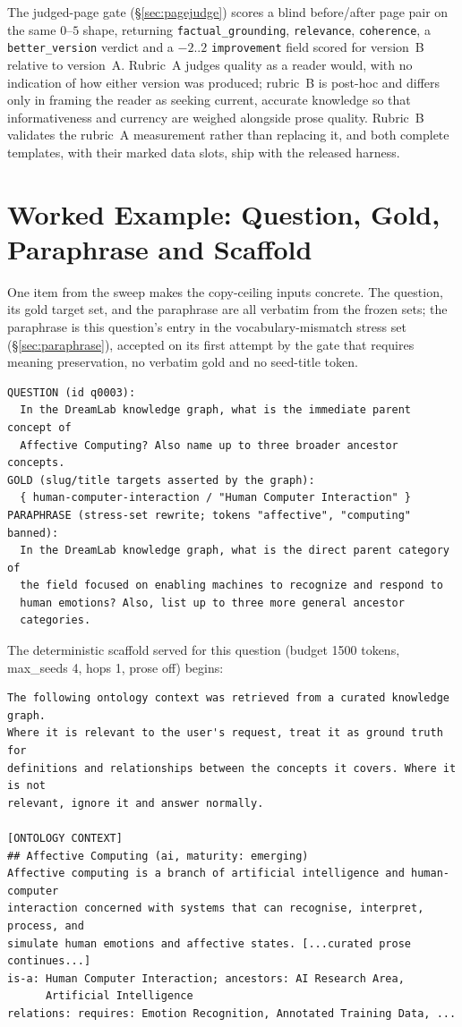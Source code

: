 \documentclass[10pt,twocolumn]{article}
\begin{document}
\noindent The judged-page gate (\S\ref{sec:pagejudge}) scores a blind before/after page pair on the
same $0$--$5$ shape, returning \texttt{factual\_grounding}, \texttt{relevance}, \texttt{coherence}, a
\texttt{better\_version} verdict and a $-2..2$ \texttt{improvement} field scored for version~B relative
to version~A. Rubric~A judges quality as a reader would, with no indication of how either version was
produced; rubric~B is post-hoc and differs only in framing the reader as
seeking current, accurate knowledge so that informativeness and currency are weighed alongside prose
quality. Rubric~B validates the rubric~A measurement rather than replacing it, and both complete templates,
with their marked data slots, ship with the released harness.

\section{Worked Example: Question, Gold, Paraphrase and Scaffold}\label{sec:appendix-samples}
One item from the sweep makes the copy-ceiling inputs concrete. The question, its gold
target set, and the paraphrase are all verbatim from the frozen sets; the paraphrase is this
question's entry in the vocabulary-mismatch stress set (\S\ref{sec:paraphrase}), accepted on its
first attempt by the gate that requires meaning preservation, no verbatim gold and no seed-title
token.

{\footnotesize\begin{verbatim}
QUESTION (id q0003):
  In the DreamLab knowledge graph, what is the immediate parent concept of
  Affective Computing? Also name up to three broader ancestor concepts.
GOLD (slug/title targets asserted by the graph):
  { human-computer-interaction / "Human Computer Interaction" }
PARAPHRASE (stress-set rewrite; tokens "affective", "computing" banned):
  In the DreamLab knowledge graph, what is the direct parent category of
  the field focused on enabling machines to recognize and respond to
  human emotions? Also, list up to three more general ancestor
  categories.
\end{verbatim}}

\noindent The deterministic scaffold served for this question (budget 1500 tokens, max\_seeds 4,
hops 1, prose off) begins:

{\footnotesize\begin{verbatim}
The following ontology context was retrieved from a curated knowledge graph.
Where it is relevant to the user's request, treat it as ground truth for
definitions and relationships between the concepts it covers. Where it is not
relevant, ignore it and answer normally.

[ONTOLOGY CONTEXT]
## Affective Computing (ai, maturity: emerging)
Affective computing is a branch of artificial intelligence and human-computer
interaction concerned with systems that can recognise, interpret, process, and
simulate human emotions and affective states. [...curated prose continues...]
is-a: Human Computer Interaction; ancestors: AI Research Area,
      Artificial Intelligence
relations: requires: Emotion Recognition, Annotated Training Data, ...
\end{verbatim}}
\end{document}
